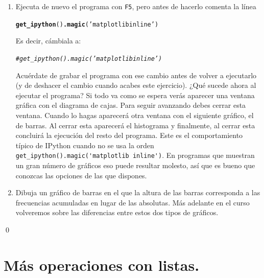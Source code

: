 \documentclass[10pt,a4paper]{article}\usepackage[]{graphicx}\usepackage[]{color}
\makeatletter
\newcommand{\hlstr}[1]{\textcolor[rgb]{0.192,0.494,0.8}{#1}}%
\newcommand{\hlcom}[1]{\textcolor[rgb]{0.678,0.584,0.686}{\textit{#1}}}%
\newcommand{\hlkwd}[1]{\textcolor[rgb]{0.737,0.353,0.396}{\textbf{#1}}}%
\newenvironment{kframe}{%
 \def\at@end@of@kframe{}%
 \ifinner\ifhmode%
  \def\at@end@of@kframe{\end{minipage}}%
  \begin{minipage}{\columnwidth}%
 \fi\fi%
 \def\FrameCommand##1{\hskip\@totalleftmargin \hskip-\fboxsep
 \colorbox{shadecolor}{##1}\hskip-\fboxsep
     \hskip-\linewidth \hskip-\@totalleftmargin \hskip\columnwidth}%
 \MakeFramed {\advance\hsize-\width
   \@totalleftmargin\z@ \linewidth\hsize
   \@setminipage}}%
 {\par\unskip\endMakeFramed%
 \at@end@of@kframe}
\newenvironment{knitrout}{}{} %
\makeatother
\begin{document}
\begin{ejercicio}
\begin{enumerate}
\item Ejecuta de nuevo el programa con {\tt F5}, pero antes de hacerlo comenta la línea
\begin{knitrout}
\color{fgcolor}\begin{kframe}
\begin{alltt}
\hlkwd{get_ipython}()\hlkwd{.magic}(\hlstr{'matplotlib inline'})
\end{alltt}
\end{kframe}
\end{knitrout}
Es decir, cámbiala a:
\begin{knitrout}
\color{fgcolor}\begin{kframe}
\begin{alltt}
\hlcom{# get_ipython().magic('matplotlib inline')}
\end{alltt}
\end{kframe}
\end{knitrout}
Acuérdate de grabar el programa con ese cambio antes de volver a ejecutarlo (y de deshacer el cambio cuando acabes este ejercicio). ¿Qué sucede ahora al ejecutar el programa? Si todo va como se espera verás aparecer una ventana gráfica con el diagrama de cajas. Para seguir avanzando debes cerrar esta ventana. Cuando lo hagas aparecerá otra ventana con el siguiente gráfico, el de barras. Al cerrar esta aparecerá el histograma y finalmente, al cerrar esta concluirá la ejecución del resto del programa. Este es el comportamiento típico de IPython cuando no se usa la orden \verb& get_ipython().magic('matplotlib inline')&. En programas que muestran un gran número de gráficos eso puede resultar molesto, así que es bueno que conozcas las opciones de las que dispones.

\item Dibuja un gráfico de barras en el que la altura de las barras corresponda a las  frecuencias acumuladas en lugar de las absolutas. Más adelante en el curso volveremos sobre las diferencias entre estos dos tipos de gráficos.

\end{enumerate}
\qed
\end{ejercicio}

\section{Más operaciones con listas.}
\label{tut02:sec:masOperacionesListas}
\end{document}
